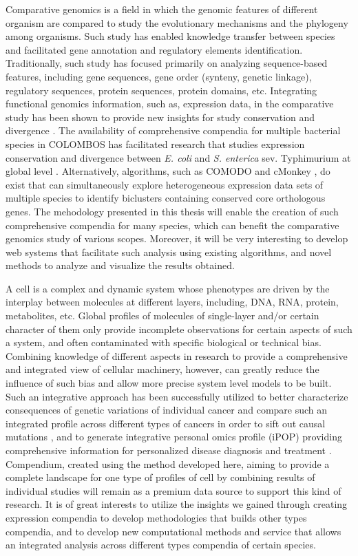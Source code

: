 Comparative genomics is a field in which the genomic features of different organism are compared to study the evolutionary mechanisms and the phylogeny among organisms.  Such study has enabled knowledge transfer between species and facilitated gene annotation and regulatory elements identification. Traditionally, such study has focused primarily on analyzing sequence-based features, including gene sequences, gene order (synteny, genetic linkage), regulatory sequences, protein sequences, protein domains, etc. Integrating functional genomics information, such as, expression data, in the comparative study has been shown to provide new insights for study conservation and divergence \cite{Bergmann2004}. The availability of comprehensive compendia for multiple bacterial species in COLOMBOS has facilitated research that studies expression conservation and divergence between \textit{E. coli} and \textit{S. enterica} sev. Typhimurium at global level \cite{Meysman2013}. Alternatively, algorithms, such as COMODO \cite{Zarrineh2011} and cMonkey \cite{Waltman2010}, do exist that can simultaneously explore heterogeneous expression data sets of multiple species to identify biclusters containing conserved core orthologous genes. The mehodology presented in this thesis will enable the creation of such comprehensive compendia for many species, which can benefit the comparative genomics study of various scopes. Moreover, it will be very interesting to develop web systems that facilitate such analysis using existing algorithms, and novel methods to analyze and visualize the results obtained.




A cell is a complex and dynamic system whose phenotypes are driven by the interplay between molecules at different layers, including, DNA, RNA, protein, metabolites, etc. Global profiles of molecules of single-layer and/or certain character of them only provide incomplete observations for certain aspects of such a system, and often contaminated with specific biological or technical bias. Combining knowledge of different aspects in research to provide a comprehensive and integrated view of cellular machinery, however, can greatly reduce the influence of such bias and allow more precise system level models to be built. Such an integrative approach has been successfully utilized  to better characterize consequences of genetic variations of individual cancer and compare such an integrated profile across different types of cancers in order to sift out causal mutations \cite{Weinstein2013}, and to generate integrative personal omics profile (iPOP) providing comprehensive information for personalized disease diagnosis and treatment \cite{Chen2012}. Compendium, created using the method developed here, aiming to provide a complete landscape for one type of profiles of cell by combining results of individual studies will remain as a premium data source to support this kind of research. It is of great interests to utilize the insights we gained through creating expression compendia to develop methodologies that builds other types compendia, and to develop new computational methods and service that allows an integrated analysis across different types compendia of certain species.




\cleardoublepage

